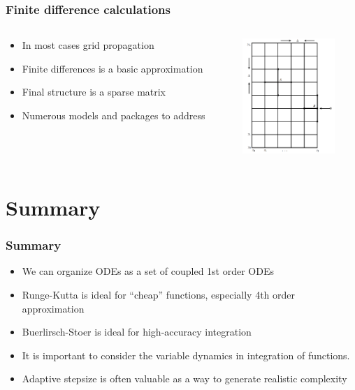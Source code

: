\documentclass[10pt]{beamer}
\begin{document}
\begin{frame}
  \frametitle{Finite difference calculations}
  \begin{columns}
    \begin{column}{7cm}
      \begin{itemize}
      \item In most cases grid propagation
      \item Finite differences is a basic approximation
      \item Final structure is a sparse matrix 
      \item Numerous models and packages to address
      \end{itemize}
    \end{column}
    \begin{column}{4cm}
      \includegraphics[width=3.5cm]{finite-differences}
    \end{column}
  \end{columns}
\end{frame}


\section{Summary}

\begin{frame}
  \frametitle{Summary}
  \begin{itemize}
  \item We can organize ODEs as a set of coupled 1st order ODEs
  \item Runge-Kutta is ideal for ``cheap'' functions, especially 4th
    order approximation
  \item Buerlirsch-Stoer is ideal for high-accuracy integration
  \item It is important to consider the variable dynamics in
    integration of functions.
  \item Adaptive stepsize is often valuable as a way to generate
    realistic complexity
  \end{itemize}
\end{frame}
\end{document}
